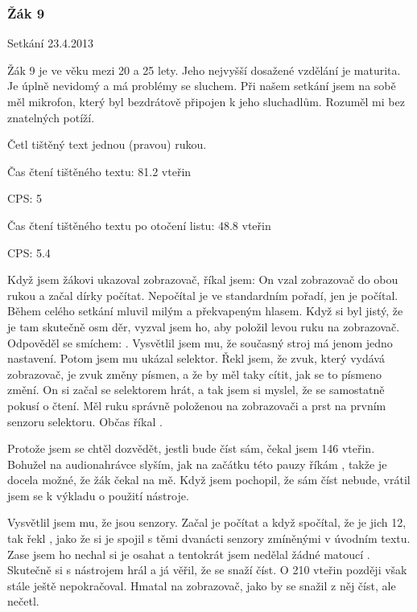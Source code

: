 \subsubsection{Žák 9}
Setkání 23.4.2013

Žák 9 je ve věku mezi 20 a 25 lety.  Jeho nejvyšší dosažené vzdělání je maturita.  Je úplně nevidomý a má problémy se sluchem.  Při našem setkání jsem na sobě měl mikrofon, který byl bezdrátově připojen k jeho sluchadlům.  Rozuměl mi bez znatelných potíží.

Četl tištěný text jednou (pravou) rukou.

Čas čtení tištěného textu: 81.2 vteřin

CPS: 5

Čas čtení tištěného textu po otočení listu: 48.8 vteřin

CPS: 5.4

Když jsem žákovi ukazoval zobrazovač, říkal jsem:  On vzal zobrazovač do obou rukou a začal dírky počítat. Nepočítal je ve standardním pořadí, jen je počítal.  Během celého setkání mluvil milým a překvapeným hlasem. Když si byl jistý, že je tam skutečně osm děr, vyzval jsem ho, aby položil levou ruku na zobrazovač.  Odpověděl se smíchem: . Vysvětlil jsem mu, že současný stroj má jenom jedno nastavení.  Potom jsem mu ukázal selektor.  Řekl jsem, že zvuk, který vydává zobrazovač, je zvuk změny písmen, a že by měl taky cítit, jak se to písmeno změní.  On si začal se selektorem hrát, a tak jsem si myslel, že se samostatně pokusí o čtení.  Měl ruku správně položenou na zobrazovači a prst na prvním senzoru selektoru.  Občas říkal .

Protože jsem se chtěl dozvědět, jestli bude číst sám, čekal jsem 146 vteřin.  Bohužel na audionahrávce slyším, jak na začátku této pauzy říkám , takže je docela možné, že žák čekal na mě.  Když jsem pochopil, že sám číst nebude, vrátil jsem se k výkladu o použití nástroje.

Vysvětlil jsem mu, že  jsou senzory.  Začal je počítat a když spočítal, že je jich 12, tak řekl , jako že si je spojil s těmi dvanácti senzory zmíněnými v úvodním textu. Zase jsem ho nechal si je osahat a tentokrát jsem nedělal žádné matoucí .  Skutečně si s nástrojem hrál a já věřil, že se snaží číst. O 210 vteřin později však stále ještě nepokračoval.  Hmatal na zobrazovač, jako by se snažil z něj číst, ale nečetl. %

